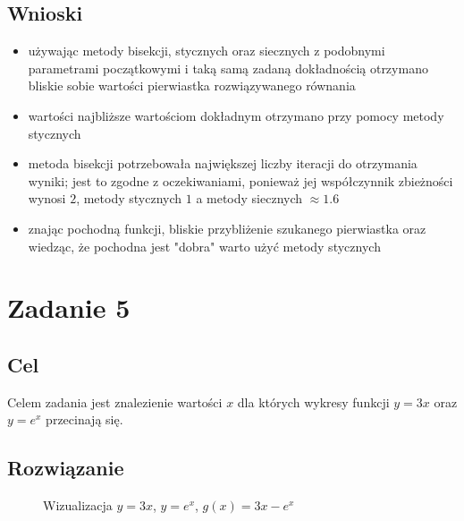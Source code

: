 \documentclass{article}
\begin{document}
\subsection{Wnioski}
\begin{itemize}
    \item używając metody bisekcji, stycznych oraz siecznych z podobnymi parametrami początkowymi i taką samą zadaną dokładnością 
    otrzymano bliskie sobie wartości pierwiastka rozwiązywanego równania
    \item wartości najbliższe wartościom dokładnym otrzymano przy pomocy metody stycznych
    \item metoda bisekcji potrzebowała największej liczby iteracji do otrzymania wyniki; jest to zgodne z oczekiwaniami, 
    ponieważ jej współczynnik zbieżności wynosi $2$, metody stycznych $1$ a metody siecznych $\approx 1.6$
    \item znając pochodną funkcji, bliskie przybliżenie szukanego pierwiastka oraz wiedząc, że pochodna jest "dobra" warto użyć metody stycznych
\end{itemize}

\newpage

\section{Zadanie 5}
\subsection{Cel}
Celem zadania jest znalezienie wartości $x$ dla których wykresy funkcji $y = 3x$ oraz $y = e^x$ przecinają się.

\subsection{Rozwiązanie}
\begin{figure}[h!]
    \centering
    \caption{Wizualizacja $y=3x$, $y=e^x$, $g(x) = 3x - e^x$}
\end{figure}
\end{document}
